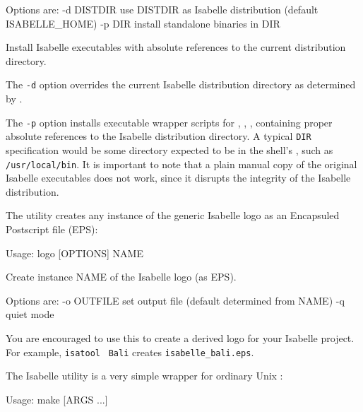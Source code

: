 \begin{isabellebody}
\begin{isamarkuptext}
\begin{ttbox}
  Options are:
    -d DISTDIR   use DISTDIR as Isabelle distribution
                 (default ISABELLE_HOME)
    -p DIR       install standalone binaries in DIR

  Install Isabelle executables with absolute references to the current
  distribution directory.
\end{ttbox}

  The \verb|-d| option overrides the current Isabelle
  distribution directory as determined by \hyperlink{setting.ISABELLE-HOME}{\mbox{}}.

  The \verb|-p| option installs executable wrapper scripts for
  \hyperlink{executable.isabelle-process}{\mbox{}}, \hyperlink{executable.isatool}{\mbox{}},
  \hyperlink{executable.Isabelle}{\mbox{}}, containing proper absolute references to the
  Isabelle distribution directory.  A typical \verb|DIR|
  specification would be some directory expected to be in the shell's
  \hyperlink{setting.PATH}{\mbox{}}, such as \verb|/usr/local/bin|.  It is
  important to note that a plain manual copy of the original Isabelle
  executables does not work, since it disrupts the integrity of the
  Isabelle distribution.%
\end{isamarkuptext}%
\isamarkuptrue%
%
\isamarkuptrue%
%
\begin{isamarkuptext}%
The \hypertarget{tool.logo}{\hyperlink{tool.logo}{\mbox{}}} utility creates any instance of the generic
  Isabelle logo as an Encapsuled Postscript file (EPS):
\begin{ttbox}
Usage: logo [OPTIONS] NAME

  Create instance NAME of the Isabelle logo (as EPS).

  Options are:
    -o OUTFILE   set output file (default determined from NAME)
    -q           quiet mode
\end{ttbox}
  You are encouraged to use this to create a derived logo for your
  Isabelle project.  For example, \verb|isatool| \hyperlink{tool.logo}{\mbox{}}~\verb|Bali| creates \verb|isabelle_bali.eps|.%
\end{isamarkuptext}%
\isamarkuptrue%
%
\isamarkuptrue%
%
\begin{isamarkuptext}%
The Isabelle \hypertarget{tool.make}{\hyperlink{tool.make}{\mbox{}}} utility is a very simple wrapper for
  ordinary Unix \hyperlink{executable.make}{\mbox{}}:
\begin{ttbox}
Usage: make [ARGS ...]


\end{ttbox}
\end{isamarkuptext}
\end{isabellebody}
